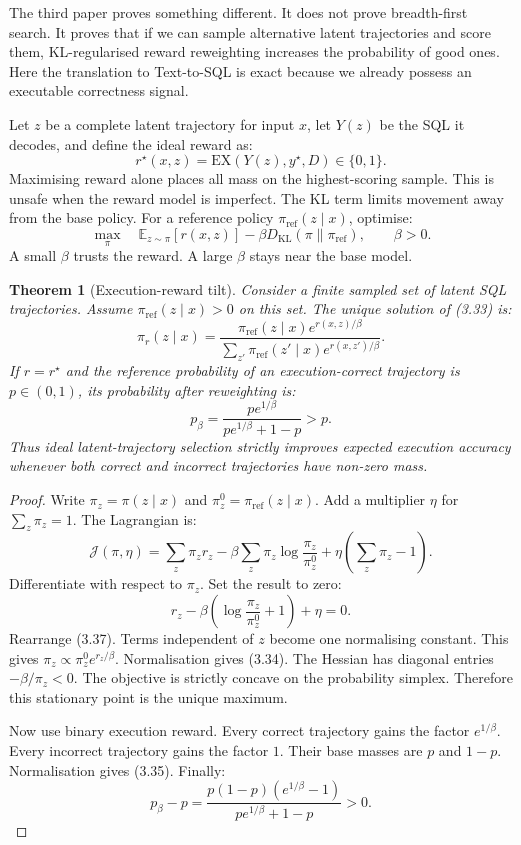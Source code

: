 \documentclass[11pt]{article}
\newtheorem{theorem}{Theorem}
\theoremstyle{definition}
\begin{document}
The third paper proves something different. It does not prove breadth-first search. It proves that if we can sample alternative latent trajectories and score them, KL-regularised reward reweighting increases the probability of good ones. Here the translation to Text-to-SQL is exact because we already possess an executable correctness signal.

Let $z$ be a complete latent trajectory for input $x$, let $Y(z)$ be the SQL it decodes, and define the ideal reward as:
\[
r^\star(x,z)=\mathrm{EX}(Y(z),y^\star,D)\in\{0,1\}.
\tag{3.32}
\]
Maximising reward alone places all mass on the highest-scoring sample. This is unsafe when the reward model is imperfect. The KL term limits movement away from the base policy. For a reference policy $\pi_{\mathrm{ref}}(z\mid x)$, optimise:
\[
\max_\pi\quad
\mathbb E_{z\sim\pi}[r(x,z)]
-\beta D_{\mathrm{KL}}(\pi\|\pi_{\mathrm{ref}}),\qquad \beta>0.
\tag{3.33}
\]
A small $\beta$ trusts the reward. A large $\beta$ stays near the base model.

\begin{theorem}[Execution-reward tilt]
\label{thm:sql-lto}
Consider a finite sampled set of latent SQL trajectories. Assume $\pi_{\mathrm{ref}}(z\mid x)>0$ on this set. The unique solution of (3.33) is:
\[
\pi_r(z\mid x)=
\frac{\pi_{\mathrm{ref}}(z\mid x)e^{r(x,z)/\beta}}
     {\sum_{z'}\pi_{\mathrm{ref}}(z'\mid x)e^{r(x,z')/\beta}}.
\tag{3.34}
\]
If $r=r^\star$ and the reference probability of an execution-correct trajectory is $p\in(0,1)$, its probability after reweighting is:
\[
p_\beta=\frac{pe^{1/\beta}}{pe^{1/\beta}+1-p}>p.
\tag{3.35}
\]
Thus ideal latent-trajectory selection strictly improves expected execution accuracy whenever both correct and incorrect trajectories have non-zero mass.
\end{theorem}

\begin{proof}
Write $\pi_z=\pi(z\mid x)$ and $\pi_z^0=\pi_{\mathrm{ref}}(z\mid x)$. Add a multiplier $\eta$ for $\sum_z\pi_z=1$. The Lagrangian is:
\[
\mathcal J(\pi,\eta)=
\sum_z\pi_zr_z
-\beta\sum_z\pi_z\log\frac{\pi_z}{\pi_z^0}
+\eta\left(\sum_z\pi_z-1\right).
\tag{3.36}
\]
Differentiate with respect to $\pi_z$. Set the result to zero:
\[
r_z-\beta\left(\log\frac{\pi_z}{\pi_z^0}+1\right)+\eta=0.
\tag{3.37}
\]
Rearrange (3.37). Terms independent of $z$ become one normalising constant. This gives $\pi_z\propto\pi_z^0e^{r_z/\beta}$. Normalisation gives (3.34). The Hessian has diagonal entries $-\beta/\pi_z<0$. The objective is strictly concave on the probability simplex. Therefore this stationary point is the unique maximum.

Now use binary execution reward. Every correct trajectory gains the factor $e^{1/\beta}$. Every incorrect trajectory gains the factor $1$. Their base masses are $p$ and $1-p$. Normalisation gives (3.35). Finally:
\[
p_\beta-p=
\frac{p(1-p)(e^{1/\beta}-1)}{pe^{1/\beta}+1-p}>0.
\tag{3.38}
\]
\end{proof}
\end{document}
